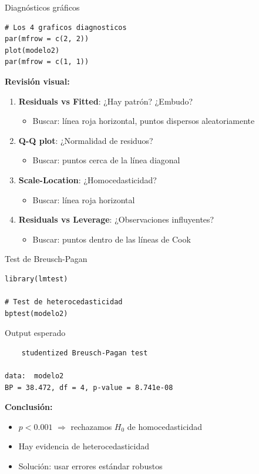 \documentclass[aspectratio=169, 11pt]{beamer}
\begin{document}
\begin{frame}[fragile]{Diagnósticos gráficos}
\begin{lstlisting}
# Los 4 graficos diagnosticos
par(mfrow = c(2, 2))
plot(modelo2)
par(mfrow = c(1, 1))
\end{lstlisting}

\textbf{Revisión visual:}
\begin{enumerate}
\item \textbf{Residuals vs Fitted}: ¿Hay patrón? ¿Embudo?
  \begin{itemize}
  \item Buscar: línea roja horizontal, puntos dispersos aleatoriamente
  \end{itemize}
\item \textbf{Q-Q plot}: ¿Normalidad de residuos?
  \begin{itemize}
  \item Buscar: puntos cerca de la línea diagonal
  \end{itemize}
\item \textbf{Scale-Location}: ¿Homocedasticidad?
  \begin{itemize}
  \item Buscar: línea roja horizontal
  \end{itemize}
\item \textbf{Residuals vs Leverage}: ¿Observaciones influyentes?
  \begin{itemize}
  \item Buscar: puntos dentro de las líneas de Cook
  \end{itemize}
\end{enumerate}
\end{frame}

\begin{frame}[fragile]{Test de Breusch-Pagan}
\begin{lstlisting}
library(lmtest)

# Test de heterocedasticidad
bptest(modelo2)
\end{lstlisting}

\vspace{0.15cm}
\begin{exampleblock}{Output esperado}
\small
\begin{verbatim}
    studentized Breusch-Pagan test

data:  modelo2
BP = 38.472, df = 4, p-value = 8.741e-08
\end{verbatim}
\end{exampleblock}

\textbf{Conclusi\'on:}
\begin{itemize}\setlength{\itemsep}{0pt}
\item $p < 0.001$ $\Rightarrow$ rechazamos $H_0$ de homocedasticidad
\item Hay evidencia de heterocedasticidad
\item Soluci\'on: usar errores est\'andar robustos
\end{itemize}
\end{frame}
\end{document}
